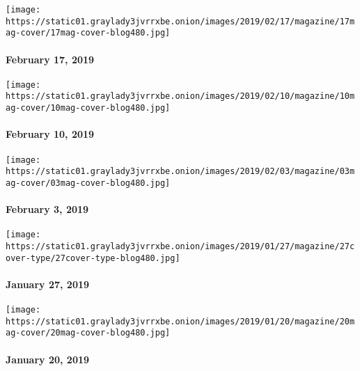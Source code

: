 \href{https://www.nytimes3xbfgragh.onion/issue/magazine/2019/02/19/the-21719-issue}{}

\texttt{[image: https://static01.graylady3jvrrxbe.onion/images/2019/02/17/magazine/17mag-cover/17mag-cover-blog480.jpg]}

\hypertarget{february-17-2019}{%
\paragraph{February 17, 2019}\label{february-17-2019}}

\href{https://www.nytimes3xbfgragh.onion/issue/magazine/2019/02/08/the-021019-issue}{}

\texttt{[image: https://static01.graylady3jvrrxbe.onion/images/2019/02/10/magazine/10mag-cover/10mag-cover-blog480.jpg]}

\hypertarget{february-10-2019}{%
\paragraph{February 10, 2019}\label{february-10-2019}}

\href{https://www.nytimes3xbfgragh.onion/issue/magazine/2019/02/08/the-020319-issue}{}

\texttt{[image: https://static01.graylady3jvrrxbe.onion/images/2019/02/03/magazine/03mag-cover/03mag-cover-blog480.jpg]}

\hypertarget{february-3-2019}{%
\paragraph{February 3, 2019}\label{february-3-2019}}

\href{https://www.nytimes3xbfgragh.onion/issue/magazine/2019/01/28/the-12719-issue}{}

\texttt{[image: https://static01.graylady3jvrrxbe.onion/images/2019/01/27/magazine/27cover-type/27cover-type-blog480.jpg]}

\hypertarget{january-27-2019}{%
\paragraph{January 27, 2019}\label{january-27-2019}}

\href{https://www.nytimes3xbfgragh.onion/issue/magazine/2019/01/18/the-12019-issue}{}

\texttt{[image: https://static01.graylady3jvrrxbe.onion/images/2019/01/20/magazine/20mag-cover/20mag-cover-blog480.jpg]}

\hypertarget{january-20-2019}{%
\paragraph{January 20, 2019}\label{january-20-2019}}

